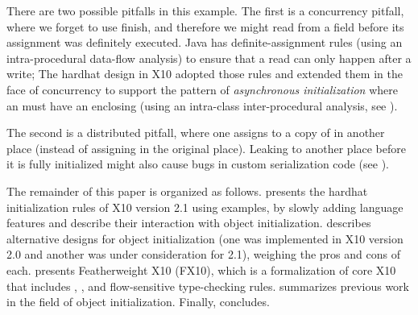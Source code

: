 There are two possible pitfalls in this example.
The first is a concurrency pitfall, where we forget to use finish,
    and therefore we might read from a field before its assignment was definitely executed.
Java has definite-assignment rules (using an intra-procedural data-flow analysis)
    to ensure that a read can only happen after a write;
    The hardhat design in X10 adopted those rules
        and extended them in the face of concurrency to support the pattern of
            \emph{asynchronous initialization}
            where an  must have an enclosing 
    (using an intra-class inter-procedural analysis, see ).

The second is a distributed pitfall, where
    one assigns to a copy of \this in another place (instead of assigning in the original place).
Leaking \this to another place before it is fully initialized
    might also cause bugs in custom serialization code (see ).



The remainder of this paper is organized as follows.
 presents the hardhat initialization rules of X10 version 2.1
    using examples,
    by slowly adding language features and describe their interaction with
    object initialization.
 describes alternative designs for object initialization
    (one was implemented in X10 version 2.0 and another was under consideration for 2.1),
    weighing the pros and cons of each.
 presents Featherweight X10 (FX10), which is a formalization of core X10
    that includes \finish, \async, and flow-sensitive type-checking rules.
 summarizes previous work in the field of object initialization.
Finally,  concludes.
